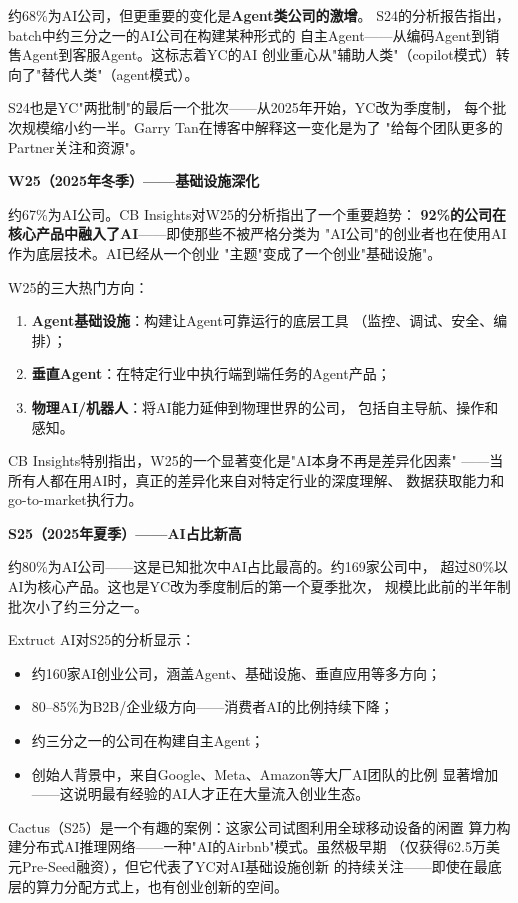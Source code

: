 约68\%为AI公司，但更重要的变化是\textbf{Agent类公司的激增}。
S24的分析报告指出，batch中约三分之一的AI公司在构建某种形式的
自主Agent——从编码Agent到销售Agent到客服Agent。这标志着YC的AI
创业重心从"辅助人类"（copilot模式）转向了"替代人类"（agent模式）。

S24也是YC"两批制"的最后一个批次——从2025年开始，YC改为季度制，
每个批次规模缩小约一半。Garry Tan在博客中解释这一变化是为了
"给每个团队更多的Partner关注和资源"。

\textbf{W25（2025年冬季）——基础设施深化}

约67\%为AI公司。CB Insights对W25的分析指出了一个重要趋势：
\textbf{92\%的公司在核心产品中融入了AI}——即使那些不被严格分类为
"AI公司"的创业者也在使用AI作为底层技术。AI已经从一个创业
"主题"变成了一个创业"基础设施"。

W25的三大热门方向：
\begin{enumerate}
  \item \textbf{Agent基础设施}：构建让Agent可靠运行的底层工具
    （监控、调试、安全、编排）；
  \item \textbf{垂直Agent}：在特定行业中执行端到端任务的Agent产品；
  \item \textbf{物理AI/机器人}：将AI能力延伸到物理世界的公司，
    包括自主导航、操作和感知。
\end{enumerate}

CB Insights特别指出，W25的一个显著变化是"AI本身不再是差异化因素"
——当所有人都在用AI时，真正的差异化来自对特定行业的深度理解、
数据获取能力和go-to-market执行力。

\textbf{S25（2025年夏季）——AI占比新高}

约80\%为AI公司——这是已知批次中AI占比最高的。约169家公司中，
超过80\%以AI为核心产品。这也是YC改为季度制后的第一个夏季批次，
规模比此前的半年制批次小了约三分之一。

Extruct AI对S25的分析显示：
\begin{itemize}
  \item 约160家AI创业公司，涵盖Agent、基础设施、垂直应用等多方向；
  \item 80--85\%为B2B/企业级方向——消费者AI的比例持续下降；
  \item 约三分之一的公司在构建自主Agent；
  \item 创始人背景中，来自Google、Meta、Amazon等大厂AI团队的比例
    显著增加——这说明最有经验的AI人才正在大量流入创业生态。
\end{itemize}

Cactus（S25）是一个有趣的案例：这家公司试图利用全球移动设备的闲置
算力构建分布式AI推理网络——一种"AI的Airbnb"模式。虽然极早期
（仅获得62.5万美元Pre-Seed融资），但它代表了YC对AI基础设施创新
的持续关注——即使在最底层的算力分配方式上，也有创业创新的空间。

